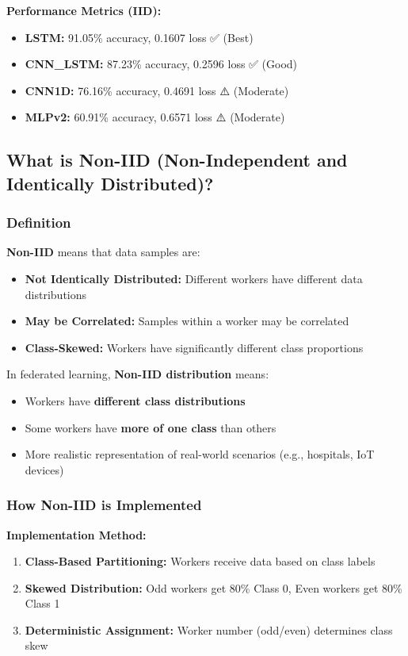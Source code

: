 \documentclass[12pt,a4paper]{article}
\begin{document}
\textbf{Performance Metrics (IID):}
\begin{itemize}
    \item \textbf{LSTM:} 91.05\% accuracy, 0.1607 loss ✅ (Best)
    \item \textbf{CNN\_LSTM:} 87.23\% accuracy, 0.2596 loss ✅ (Good)
    \item \textbf{CNN1D:} 76.16\% accuracy, 0.4691 loss ⚠️ (Moderate)
    \item \textbf{MLPv2:} 60.91\% accuracy, 0.6571 loss ⚠️ (Moderate)
\end{itemize}

\subsection{What is Non-IID (Non-Independent and Identically Distributed)?}

\subsubsection{Definition}

\textbf{Non-IID} means that data samples are:
\begin{itemize}
    \item \textbf{Not Identically Distributed:} Different workers have different data distributions
    \item \textbf{May be Correlated:} Samples within a worker may be correlated
    \item \textbf{Class-Skewed:} Workers have significantly different class proportions
\end{itemize}

In federated learning, \textbf{Non-IID distribution} means:
\begin{itemize}
    \item Workers have \textbf{different class distributions}
    \item Some workers have \textbf{more of one class} than others
    \item More realistic representation of real-world scenarios (e.g., hospitals, IoT devices)
\end{itemize}

\subsubsection{How Non-IID is Implemented}

\textbf{Implementation Method:}
\begin{enumerate}
    \item \textbf{Class-Based Partitioning:} Workers receive data based on class labels
    \item \textbf{Skewed Distribution:} Odd workers get 80\% Class 0, Even workers get 80\% Class 1
    \item \textbf{Deterministic Assignment:} Worker number (odd/even) determines class skew
\end{enumerate}
\end{document}
